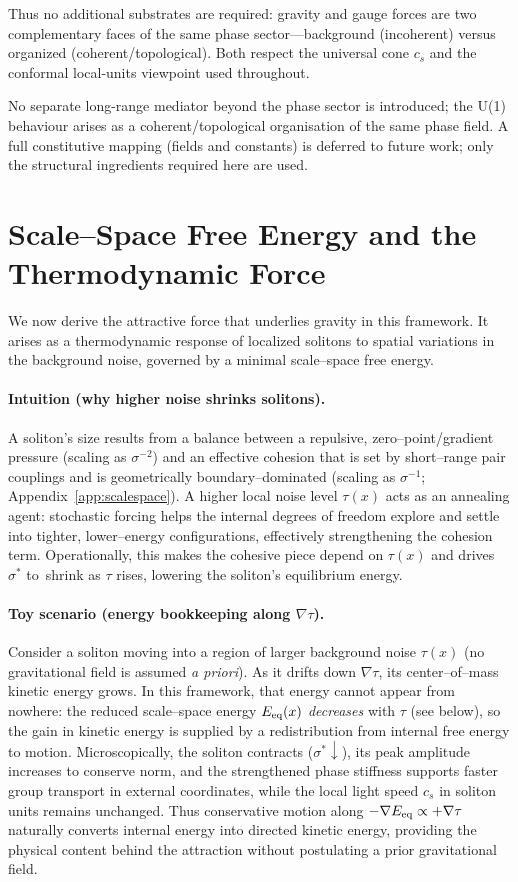 \documentclass[11pt]{article}
\begin{document}
Thus no additional substrates are required: gravity and gauge forces are two complementary faces of the same phase sector—background (incoherent) versus organized (coherent/topological). Both respect the universal cone $c_s$ and the conformal local-units viewpoint used throughout.

\noindent No separate long-range mediator beyond the phase sector is introduced; the U(1) behaviour arises as a coherent/topological organisation of the same phase field. A full constitutive mapping (fields and constants) is deferred to future work; only the structural ingredients required here are used.


\section{Scale--Space Free Energy and the Thermodynamic Force}\label{sec:scalespace}
We now derive the attractive force that underlies gravity in this framework. It arises as a thermodynamic response of localized solitons to spatial variations in the background noise, governed by a minimal scale--space free energy.

\paragraph{Intuition (why higher noise shrinks solitons).} A soliton's size results from a balance between a repulsive, zero--point/gradient pressure (scaling as $\sigma^{-2}$) and an effective cohesion that is set by short--range pair couplings and is geometrically boundary--dominated (scaling as $\sigma^{-1}$; Appendix~\ref{app:scalespace}). A higher local noise level $\tau(x)$ acts as an annealing agent: stochastic forcing helps the internal degrees of freedom explore and settle into tighter, lower--energy configurations, effectively strengthening the cohesion term. Operationally, this makes the cohesive piece depend on $\tau(x)$ and drives $\sigma^*$ to \,shrink as $\tau$ rises, lowering the soliton's equilibrium energy.

\paragraph{Toy scenario (energy bookkeeping along $\nabla\tau$).} Consider a soliton moving into a region of larger background noise $\tau(x)$ (no gravitational field is assumed \emph{a priori}). As it drifts down $\nabla\tau$, its center--of--mass kinetic energy grows. In this framework, that energy cannot appear from nowhere: the reduced scale--space energy $E_{\rm eq}(x)$ \emph{decreases} with $\tau$ (see below), so the gain in kinetic energy is supplied by a redistribution from internal free energy to motion. Microscopically, the soliton contracts ($\sigma^*\downarrow$), its peak amplitude increases to conserve norm, and the strengthened phase stiffness supports faster group transport in external coordinates, while the local light speed $c_s$ in soliton units remains unchanged. Thus conservative motion along $-\nabla E_{\rm eq}\propto +\nabla\tau$ naturally converts internal energy into directed kinetic energy, providing the physical content behind the attraction without postulating a prior gravitational field.
\end{document}
